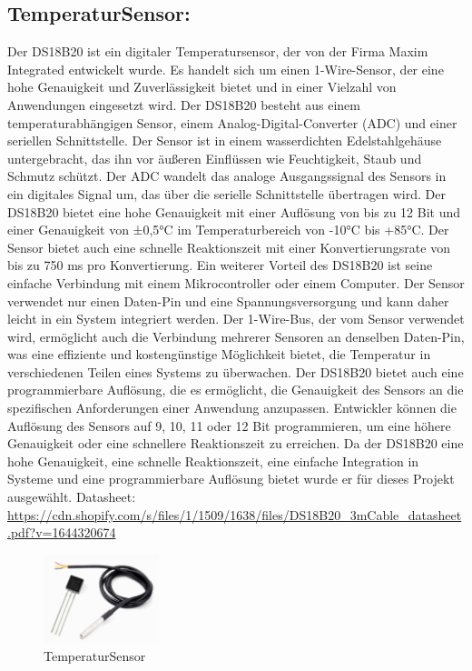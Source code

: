 \subsection*{TemperaturSensor:}
Der DS18B20 ist ein digitaler Temperatursensor, der von der Firma Maxim Integrated entwickelt wurde. Es handelt sich um einen 1-Wire-Sensor, der eine hohe Genauigkeit und Zuverlässigkeit bietet und in einer Vielzahl von Anwendungen eingesetzt wird.
Der DS18B20 besteht aus einem temperaturabhängigen Sensor, einem Analog-Digital-Converter (ADC) und einer seriellen Schnittstelle. Der Sensor ist in einem wasserdichten Edelstahlgehäuse untergebracht, das ihn vor äußeren Einflüssen wie Feuchtigkeit, Staub und Schmutz schützt. Der ADC wandelt das analoge Ausgangssignal des Sensors in ein digitales Signal um, das über die serielle Schnittstelle übertragen wird.
Der DS18B20 bietet eine hohe Genauigkeit mit einer Auflösung von bis zu 12 Bit und einer Genauigkeit von ±0,5°C im Temperaturbereich von -10°C bis +85°C. Der Sensor bietet auch eine schnelle Reaktionszeit mit einer Konvertierungsrate von bis zu 750 ms pro Konvertierung.
Ein weiterer Vorteil des DS18B20 ist seine einfache Verbindung mit einem Mikrocontroller oder einem Computer. Der Sensor verwendet nur einen Daten-Pin und eine Spannungsversorgung und kann daher leicht in ein System integriert werden. Der 1-Wire-Bus, der vom Sensor verwendet wird, ermöglicht auch die Verbindung mehrerer Sensoren an denselben Daten-Pin, was eine effiziente und kostengünstige Möglichkeit bietet, die Temperatur in verschiedenen Teilen eines Systems zu überwachen.
Der DS18B20 bietet auch eine programmierbare Auflösung, die es ermöglicht, die Genauigkeit des Sensors an die spezifischen Anforderungen einer Anwendung anzupassen. Entwickler können die Auflösung des Sensors auf 9, 10, 11 oder 12 Bit programmieren, um eine höhere Genauigkeit oder eine schnellere Reaktionszeit zu erreichen.
Da der DS18B20 eine hohe Genauigkeit, eine schnelle Reaktionszeit, eine einfache Integration in Systeme und eine programmierbare Auflösung bietet wurde er für dieses Projekt ausgewählt. 
\newline
Datasheet: \url{https://cdn.shopify.com/s/files/1/1509/1638/files/DS18B20_3mCable_datasheet.pdf?v=1644320674}

\begin{figure}[b]
    \centering
    \includegraphics[width=0.3\textwidth]{./pics/TempSensBild.jpeg}
    \caption{TemperaturSensor}
    \label{fig:TemperaturSensor}
\end{figure}





